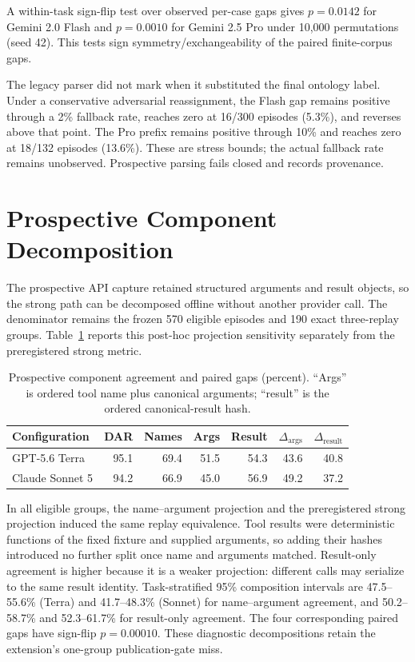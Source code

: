 \documentclass{article}
\begin{document}
A within-task sign-flip test over observed per-case gaps gives \(p=0.0142\)
for Gemini 2.0 Flash and \(p=0.0010\) for Gemini 2.5 Pro under 10,000
permutations (seed 42).  This tests sign symmetry/exchangeability of the paired
finite-corpus gaps.

The legacy parser did not mark when it substituted the final ontology label.
Under a conservative adversarial reassignment, the Flash gap remains positive
through a 2\% fallback rate, reaches zero at 16/300 episodes (5.3\%), and
reverses above that point.  The Pro prefix remains positive through 10\% and
reaches zero at 18/132 episodes (13.6\%).  These are stress bounds; the actual
fallback rate remains unobserved.  Prospective parsing fails closed and
records provenance.

\section{Prospective Component Decomposition}
\label{app:components}

The prospective API capture retained structured arguments and result objects,
so the strong path can be decomposed offline without another provider call.
The denominator remains the frozen 570 eligible episodes and 190 exact
three-replay groups.  Table~\ref{tab:components} reports this post-hoc
projection sensitivity separately from the preregistered strong metric.

\begin{table}[htbp]
\caption{Prospective component agreement and paired gaps (percent).  ``Args''
is ordered tool name plus canonical arguments; ``result'' is the ordered
canonical-result hash.}
\label{tab:components}
\centering
\small
\begin{tabular}{@{}lrrrrrr@{}}
\toprule
Configuration & DAR & Names & Args & Result & \(\Delta_{\mathrm{args}}\) & \(\Delta_{\mathrm{result}}\) \\
\midrule
GPT-5.6 Terra & 95.1 & 69.4 & 51.5 & 54.3 & 43.6 & 40.8 \\
Claude Sonnet 5 & 94.2 & 66.9 & 45.0 & 56.9 & 49.2 & 37.2 \\
\bottomrule
\end{tabular}
\end{table}

In all eligible groups, the name--argument projection and the preregistered
strong projection induced the same replay equivalence.  Tool results were
deterministic functions of the fixed fixture and supplied arguments, so adding
their hashes introduced no further split once name and arguments matched.
Result-only agreement is higher because it is a weaker projection: different
calls may serialize to the same result identity.  Task-stratified 95\%
composition intervals are 47.5--55.6\% (Terra) and 41.7--48.3\% (Sonnet) for
name--argument agreement, and 50.2--58.7\% and 52.3--61.7\% for result-only
agreement.  The four corresponding paired gaps have sign-flip
\(p=0.00010\).  These diagnostic decompositions retain the extension's
one-group publication-gate miss.
\end{document}
